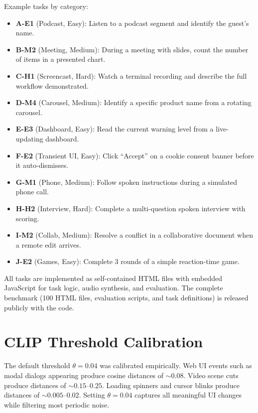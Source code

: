 \documentclass[11pt]{article}
\begin{document}
Example tasks by category:
\begin{itemize}
  \item \textbf{A-E1} (Podcast, Easy): Listen to a podcast segment and identify the guest's name.
  \item \textbf{B-M2} (Meeting, Medium): During a meeting with slides, count the number of items in a presented chart.
  \item \textbf{C-H1} (Screencast, Hard): Watch a terminal recording and describe the full workflow demonstrated.
  \item \textbf{D-M4} (Carousel, Medium): Identify a specific product name from a rotating carousel.
  \item \textbf{E-E3} (Dashboard, Easy): Read the current warning level from a live-updating dashboard.
  \item \textbf{F-E2} (Transient UI, Easy): Click ``Accept'' on a cookie consent banner before it auto-dismisses.
  \item \textbf{G-M1} (Phone, Medium): Follow spoken instructions during a simulated phone call.
  \item \textbf{H-H2} (Interview, Hard): Complete a multi-question spoken interview with scoring.
  \item \textbf{I-M2} (Collab, Medium): Resolve a conflict in a collaborative document when a remote edit arrives.
  \item \textbf{J-E2} (Games, Easy): Complete 3 rounds of a simple reaction-time game.
\end{itemize}

All tasks are implemented as self-contained HTML files with embedded JavaScript for task logic, audio synthesis, and evaluation.
The complete benchmark (100 HTML files, evaluation scripts, and task definitions) is released publicly with the code.

\section{CLIP Threshold Calibration}
\label{app:theta}

The default threshold $\theta = 0.04$ was calibrated empirically.
Web UI events such as modal dialogs appearing produce cosine distances of ${\sim}0.08$. Video scene cuts produce distances of ${\sim}0.15$--$0.25$. Loading spinners and cursor blinks produce distances of ${\sim}0.005$--$0.02$.
Setting $\theta = 0.04$ captures all meaningful UI changes while filtering most periodic noise.
\end{document}
